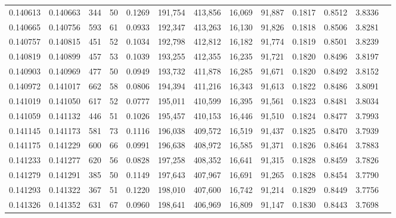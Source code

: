 \begin{tabular}{rrrrrrrrrrrrr}
0.140613 & 0.140663 &   344 &  50 &                                     0.1269 & 191,754 & 413,856 &  16,069 &  91,887 & 0.1817 & 0.8512 & 3.8336 \\
0.140665 & 0.140756 &   593 &  61 &                                     0.0933 & 192,347 & 413,263 &  16,130 &  91,826 & 0.1818 & 0.8506 & 3.8281 \\
0.140757 & 0.140815 &   451 &  52 &                                     0.1034 & 192,798 & 412,812 &  16,182 &  91,774 & 0.1819 & 0.8501 & 3.8239 \\
0.140819 & 0.140899 &   457 &  53 &                                     0.1039 & 193,255 & 412,355 &  16,235 &  91,721 & 0.1820 & 0.8496 & 3.8197 \\
0.140903 & 0.140969 &   477 &  50 &                                     0.0949 & 193,732 & 411,878 &  16,285 &  91,671 & 0.1820 & 0.8492 & 3.8152 \\
0.140972 & 0.141017 &   662 &  58 &                                     0.0806 & 194,394 & 411,216 &  16,343 &  91,613 & 0.1822 & 0.8486 & 3.8091 \\
0.141019 & 0.141050 &   617 &  52 &                                     0.0777 & 195,011 & 410,599 &  16,395 &  91,561 & 0.1823 & 0.8481 & 3.8034 \\
0.141059 & 0.141132 &   446 &  51 &                                     0.1026 & 195,457 & 410,153 &  16,446 &  91,510 & 0.1824 & 0.8477 & 3.7993 \\
0.141145 & 0.141173 &   581 &  73 &                                     0.1116 & 196,038 & 409,572 &  16,519 &  91,437 & 0.1825 & 0.8470 & 3.7939 \\
0.141175 & 0.141229 &   600 &  66 &                                     0.0991 & 196,638 & 408,972 &  16,585 &  91,371 & 0.1826 & 0.8464 & 3.7883 \\
0.141233 & 0.141277 &   620 &  56 &                                     0.0828 & 197,258 & 408,352 &  16,641 &  91,315 & 0.1828 & 0.8459 & 3.7826 \\
0.141279 & 0.141291 &   385 &  50 &                                     0.1149 & 197,643 & 407,967 &  16,691 &  91,265 & 0.1828 & 0.8454 & 3.7790 \\
0.141293 & 0.141322 &   367 &  51 &                                     0.1220 & 198,010 & 407,600 &  16,742 &  91,214 & 0.1829 & 0.8449 & 3.7756 \\
0.141326 & 0.141352 &   631 &  67 &                                     0.0960 & 198,641 & 406,969 &  16,809 &  91,147 & 0.1830 & 0.8443 & 3.7698 \\

\end{tabular}
